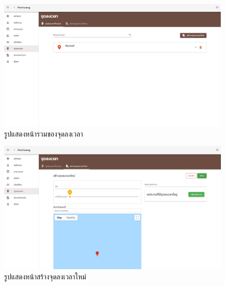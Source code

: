 \begin{figure}
  \begin{center}
    \includegraphics[width=14cm,keepaspectratio]{./images/location.jpg}
  \end{center}
  \caption[รูปแสดงหน้ารวมของจุดลงเวลา]{รูปแสดงหน้ารวมของจุดลงเวลา} 
  \label{fig:location}
\end{figure}
 
\begin{figure}
  \begin{center}
    \includegraphics[width=14cm,keepaspectratio]{./images/new_location.jpg}
  \end{center}
  \caption[รูปแสดงหน้าสร้างจุดลงเวลาใหม่]{รูปแสดงหน้าสร้างจุดลงเวลาใหม่} 
  \label{fig:new_location}
\end{figure}
 
